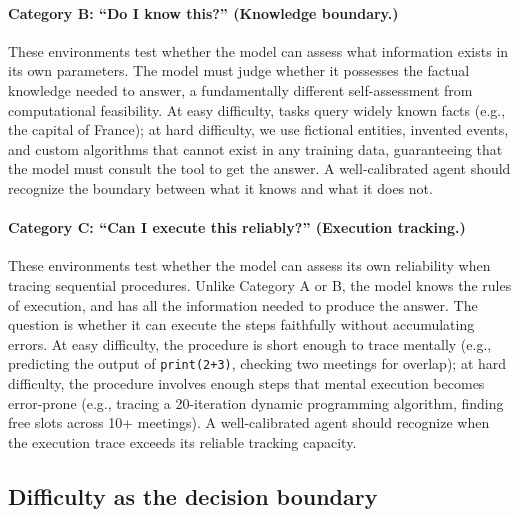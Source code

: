\paragraph{Category B: ``Do I know this?'' (Knowledge boundary.)}
These environments test whether the model can assess what information exists in its own parameters. The model must judge whether it possesses the factual knowledge needed to answer, a fundamentally different self-assessment from computational feasibility. At easy difficulty, tasks query widely known facts (e.g., the capital of France); at hard difficulty, we use fictional entities, invented events, and custom algorithms that cannot exist in any training data, guaranteeing that the model must consult the tool to get the answer. A well-calibrated agent should recognize the boundary between what it knows and what it does not.
\vspace{-5pt}
\paragraph{Category C: ``Can I execute this reliably?'' (Execution tracking.)}
These environments test whether the model can assess its own reliability when tracing sequential procedures. Unlike Category A or B, the model knows the rules of execution, and has all the information needed to produce the answer. The question is whether it can execute the steps faithfully without accumulating errors. At easy difficulty, the procedure is short enough to trace mentally (e.g., predicting the output of \texttt{print(2+3)}, checking two meetings for overlap); at hard difficulty, the procedure involves enough steps that mental execution becomes error-prone (e.g., tracing a 20-iteration dynamic programming algorithm, finding free slots across 10+ meetings). A well-calibrated agent should recognize when the execution trace exceeds its reliable tracking capacity.

\subsection{Difficulty as the decision boundary}

